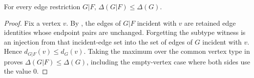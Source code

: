 \begin{lemma}
For every edge restriction $G|F$,
$\Delta(G|F)\le\Delta(G)$.
\end{lemma}
\begin{proof}
Fix a vertex $v$.  By , the edges of $G|F$ incident
with $v$ are retained edge identities whose endpoint pairs are unchanged.
Forgetting the subtype witness is an injection from that incident-edge set
into the set of edges of $G$ incident with $v$.  Hence
$d_{G|F}(v)\le d_G(v)$.  Taking the maximum over the common vertex type in
 proves
$\Delta(G|F)\le\Delta(G)$, including the empty-vertex case where both sides
use the value $0$.
\end{proof}
